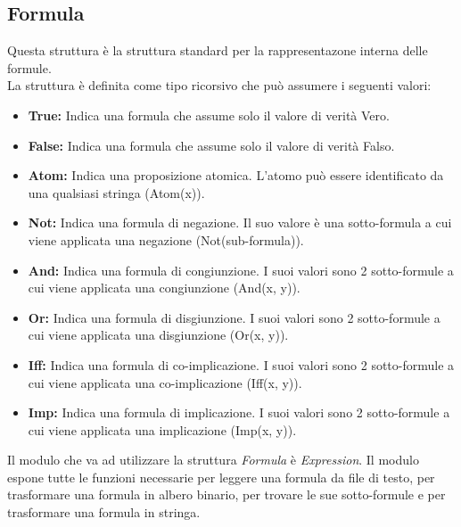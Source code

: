 \documentclass[\main/tesi.tex]{subfiles}
\begin{document}
\subsection{Formula}
Questa struttura è la struttura standard per la rappresentazone interna delle formule. \\
La struttura è definita come tipo ricorsivo che può assumere i seguenti valori:
\begin{itemize}
    \item \textbf{True:} Indica una formula che assume solo il valore di verità Vero.
    \item \textbf{False:} Indica una formula che assume solo il valore di verità Falso.
    \item \textbf{Atom:} Indica una proposizione atomica. L'atomo può essere identificato da una qualsiasi stringa (Atom(x)).
    \item \textbf{Not:} Indica una formula di negazione. Il suo valore è una sotto-formula a cui viene applicata una negazione (Not(sub-formula)).
    \item \textbf{And:} Indica una formula di congiunzione. I suoi valori sono 2 sotto-formule a cui viene applicata una congiunzione (And(x, y)).
    \item \textbf{Or:} Indica una formula di disgiunzione. I suoi valori sono 2 sotto-formule a cui viene applicata una disgiunzione (Or(x, y)).
    \item \textbf{Iff:} Indica una formula di co-implicazione. I suoi valori sono 2 sotto-formule a cui viene applicata una co-implicazione (Iff(x, y)).
    \item \textbf{Imp:} Indica una formula di implicazione. I suoi valori sono 2 sotto-formule a cui viene applicata una implicazione (Imp(x, y)).
\end{itemize}
Il modulo che va ad utilizzare la struttura \textit{Formula} è \textit{Expression}. Il modulo espone tutte le funzioni necessarie per leggere una formula da file di testo, per trasformare una formula in albero binario, per trovare le sue sotto-formule e per trasformare una formula in stringa.
\end{document}
